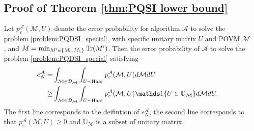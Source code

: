 \subsection{Proof of Theorem \ref{thm:PQSI lower bound}}
\label{subsec: thm lower bound}
    Let $p^{\mathcal{A}}_{e}(\mathcal{M},U)$ denote the error probability for algorithm $\mathcal{A}$ to solve the problem \ref{problem:PQDSI_special}, with specific unitary matrix $U$ and POVM $\mathcal{M}$, and  $M = \min_{M' \in \{M_0,M_1\}} \mathrm{Tr}(M')$. Then the error probability of $\mathcal{A}$ to solve the problem \ref{problem:PQDSI_special} satisfying
    \begin{equation}
        \label{eq1:proof_lower_bound}
        \begin{aligned}
            e^\mathcal{A}_N = & \int_{\mathcal{M} \in \mathcal{D}_{\mathcal{M}}} \int_{U \sim \Haar} p^\mathcal{A}_e(\mathcal{M},U) d\mathcal{M} dU \\
            \geq & \int_{\mathcal{M} \in \mathcal{D}_{\mathcal{M}}} \int_{U \sim \Haar} p^\mathcal{A}_e(\mathcal{M},U)\indicator\{U \in \mathbb{U}_\mathcal{M}\} d\mathcal{M} dU.
        \end{aligned}
    \end{equation}
    The first line corresponds to the deifintion of $e_N^\mathcal{A}$, the second line corresponds to that $p_{e}^\mathcal{A}(\mathcal{M},U) \geq 0$ and $\mathbb{U}_{\mathcal{M}}$ is a subset of unitary matrix.
    
